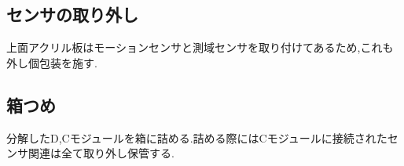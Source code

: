 \subsection{センサの取り外し}
上面アクリル板はモーションセンサと測域センサを取り付けてあるため,これも外し個包装を施す.

\subsection{箱つめ}
分解したD,Cモジュールを箱に詰める.詰める際にはCモジュールに接続されたセンサ関連は全て取り外し保管する.

